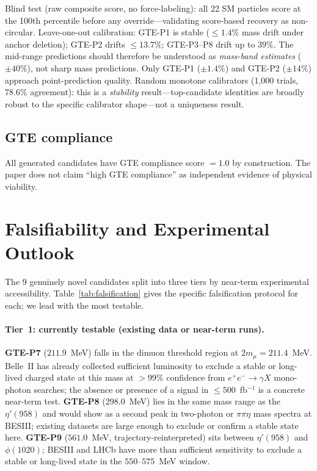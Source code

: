 \documentclass[12pt]{article}
\numberwithin{equation}{section}
\begin{document}
Blind test (raw composite score, no force-labeling): all 22 SM particles score at the 100th percentile before any override---validating score-based recovery as non-circular. Leave-one-out calibration: GTE-P1 is stable ($\leq 1.4\%$ mass drift under anchor deletion); GTE-P2 drifts $\leq 13.7\%$; GTE-P3--P8 drift up to $39\%$. The mid-range predictions should therefore be understood as \emph{mass-band estimates} ($\pm 40\%$), not sharp mass predictions. Only GTE-P1 ($\pm 1.4\%$) and GTE-P2 ($\pm 14\%$) approach point-prediction quality. Random monotone calibrators (1,000 trials, 78.6\% agreement): this is a \emph{stability} result---top-candidate identities are broadly robust to the specific calibrator shape---not a uniqueness result.

\subsection{GTE compliance}

All generated candidates have GTE compliance score $= 1.0$ by construction. The paper does not claim ``high GTE compliance'' as independent evidence of physical viability.

\section{Falsifiability and Experimental Outlook}
\label{sec:falsifiability}

The 9 genuinely novel candidates split into three tiers by near-term experimental
accessibility.  Table~\ref{tab:falsification} gives the specific falsification
protocol for each; we lead with the most testable.

\paragraph{Tier~1: currently testable (existing data or near-term runs).}
\textbf{GTE-P7} ($211.9$~MeV) falls in the dimuon threshold region
at $2m_\mu = 211.4$~MeV.  Belle~II has already collected sufficient
luminosity to exclude a stable or long-lived charged state at this mass at
$> 99\%$ confidence from $e^+e^-\to\gamma X$ mono-photon searches; the
absence or presence of a signal in $\leq 500$~fb$^{-1}$ is a concrete
near-term test.
\textbf{GTE-P8} ($298.0$~MeV) lies in the same mass range as the
$\eta'(958)$ and would show as a second peak in two-photon or
$\pi\pi\eta$ mass spectra at BESIII; existing datasets are large enough
to exclude or confirm a stable state here.
\textbf{GTE-P9} ($561.0$~MeV, trajectory-reinterpreted) sits between
$\eta'(958)$ and $\phi(1020)$; BESIII and LHCb have more than sufficient
sensitivity to exclude a stable or long-lived state in the $550$--$575$~MeV
window.
\end{document}
